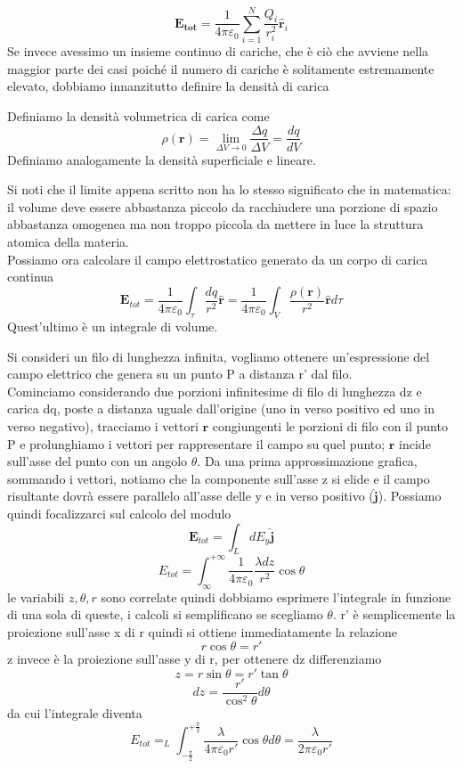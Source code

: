 \documentclass[
10pt, %
a4paper, %
oneside, %
headinclude,footinclude, %
BCOR5mm, %
]{scrartcl}
\begin{document}
\[\mathbf{E_{tot}} = \frac{1}{4\pi\varepsilon_0}\sum_{i=1}^{N}\frac{Q_i}{ r_i^2} \hat{\mathbf{r}}_i\]
Se invece avessimo un insieme continuo di cariche, che è ciò che avviene nella maggior parte dei casi poiché il numero di cariche è solitamente estremamente elevato, dobbiamo innanzitutto definire la densità di carica
\begin{definizione}
Definiamo la densità volumetrica di carica come
\[\rho(\mathbf{r})=\lim_{\Delta V \to 0} \frac{\Delta q}{\Delta V} = \frac{dq}{dV}\]
Definiamo analogamente la densità superficiale e lineare. 
\end{definizione}
Si noti che il limite appena scritto non ha lo stesso significato che in matematica: il volume deve essere abbastanza piccolo da racchiudere una porzione di spazio abbastanza omogenea ma non troppo piccola da mettere in luce la struttura atomica della materia.\\
Possiamo ora calcolare il campo elettrostatico generato da un corpo di carica continua 
\[\mathbf{E}_{tot} = \frac{1}{4\pi\varepsilon_0}\int_{\tau}\frac{dq}{r^2}\hat{\mathbf{r}} = \frac{1}{4\pi\varepsilon_0} \int_V\frac{\rho(\mathbf{r})}{r^2}\hat{\mathbf{r}}d\tau\]
Quest'ultimo è un integrale di volume.
\begin{esercizio}
Si consideri un filo di lunghezza infinita, vogliamo ottenere un'espressione del campo elettrico che genera su un punto P a distanza r' dal filo. \\
Cominciamo considerando due porzioni infinitesime di filo di lunghezza dz e carica dq, poste a distanza uguale dall'origine (uno in verso positivo ed uno in verso negativo), tracciamo i vettori $\mathbf{r}$ congiungenti le porzioni di filo con il punto P e prolunghiamo i vettori per rappresentare il campo su quel punto; $\mathbf{r}$ incide sull'asse del punto con un angolo $\theta$. Da una prima approssimazione grafica, sommando i vettori, notiamo che la componente sull'asse z si elide e il campo risultante dovrà essere parallelo all'asse delle y e in verso positivo ($\hat{\mathbf{j}}$). Possiamo quindi focalizzarci sul calcolo del modulo
\[\mathbf{E}_{tot} = \int_L dE_y\hat{\mathbf{j}}\]
\[E_{tot} = \int^{+\infty}_{\infty} \frac{1}{4\pi\varepsilon_0}\frac{\lambda dz}{r^2}\cos\theta\]
le variabili \(z, \theta, r\) sono correlate quindi dobbiamo esprimere l'integrale in funzione di una sola di queste, i calcoli si semplificano se scegliamo $\theta$. r' è semplicemente la proiezione sull'asse x di r quindi si ottiene immediatamente la relazione
\[r \cos\theta = r'\]
z invece è la proiezione sull'asse y di r, per ottenere dz differenziamo
\[z = r \sin\theta = r' \tan\theta\]
\[dz = \frac{r'}{\cos^2\theta}d\theta\]
da cui l'integrale diventa
\[E_{tot} = _L\int^{+\frac{\pi}{2}}_{-\frac{\pi}{2}} \frac{\lambda}{4\pi\varepsilon_0 r'}\cos\theta d\theta = \frac{\lambda}{2\pi\varepsilon_0 r'}\]
\end{esercizio}
\end{document}
